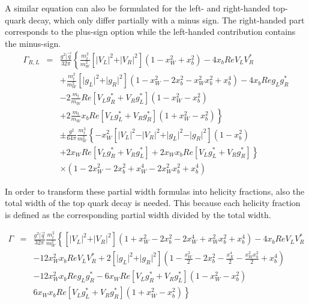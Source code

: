 A similar equation can also be formulated for the left- and right-handed top-quark decay, which only differ partially with a minus sign. The right-handed part corresponds to the plus-sign option while the left-handed contribution contains the minus-sign.
\begin{eqnarray}
 \Gamma_{R,L} & = & \frac{g^{2} \vert \vec{q}}{32 \pi} \left\lbrace \frac{m_{t}^{2}}{m_{W}^{2}} \left[ \vert V_{L} \vert^{2} + \vert V_{R} \vert^{2} \right] (1 - x_{W}^{2} + x_{b}^{2}) - 4x_{b}Re V_{L}V_{R}^{*} \right. \nonumber \\
            &   & + \frac{m_{t}^{2}}{m_{W}^{2}} \left[ \vert g_{L} \vert^{2} + \vert g_{R} \vert^{2} \right] (1 - x_{W}^{2} - 2x_{b}^{2} -x_{W}^{2} x_{b}^{2} + x_{b}^{4}) - 4x_{b}Re g_{L}g_{R}^{*} \nonumber \\
            &   & - 2 \frac{m_t}{m_W} Re \left[ V_{L}g_{R}^{*} + V_{R}g_{L}^{*} \right] (1- x_{W}^{2} - x_{b}^{2}) \nonumber \\
            &   &  \left. + 2 \frac{m_t}{m_W} x_b Re \left[ V_{L}g_{L}^{*} + V_{R}g_{R}^{*} \right] (1+ x_{W}^{2} - x_{b}^{2}) \right\rbrace \nonumber \\
           &   & \pm \frac{g^{2}}{64 \pi} \frac{m_{t}^{3}}{m_{W}^{2}} \left\lbrace -x_{W}^{2} \left[ \vert V_{L} \vert^{2} - \vert V_{R} \vert^{2} + \vert g_{L} \vert^{2} - \vert g_{R} \vert^{2} \right] (1-x_{b}^{2}) \right. \nonumber \\
            &   &  \left. + 2 x_{W} Re \left[ V_{L}g_{R}^{*} + V_{R}g_{L}^{*} \right] + 2x_{W} x_{b} Re \left[ V_{L}g_{L}^{*} + V_{R}g_{R}^{*} \right] \right\rbrace \nonumber \\
            &   & \times (1-2x_{W}^{2} - 2x_{b}^{2} + x_{W}^{4} - 2x_{W}^{2} x_{b}^{2} + x_{b}^{4})
\end{eqnarray}

In order to transform these partial width formulas into helicity fractions, also the total width of the top quark decay is needed. This because each helicity fraction is defined as the corresponding partial width divided by the total width.

\begin{eqnarray}
 \Gamma & = & \frac{g^{2} \vert \vec{q}}{32 \pi} \frac{m_{t}^{2}}{m_{W}^{2}} \left\lbrace \left[ \vert V_{L} \vert^{2} + \vert V_{R} \vert^{2} \right] (1 + x_{W}^{2} - 2x_{b}^{2} - 2 x_{W}^{4} + x_{W}^{2} x_{b}^{2} + x_{b}^{4}) - 4x_{b}Re V_{L}V_{R}^{*} \right. \nonumber \\
        &   & -12 x_{W}^{2} x_{b} Re V_{L} V_{R}^{*} + 2 \left[ \vert g_{L} \vert^{2} + \vert g_{R} \vert^{2} \right] \left( 1 - \frac{x_{W}^{2}}{2} - 2 x_{b}^{2} - \frac{x_{X}^{4}}{2} - \frac{x_{W}^{2} x_{b}^{2}}{2} +x_{b}^{4} \right) \nonumber \\
        &   & -12 x_{W}^{2} x_{b} Re g_{L} g_{R}^{*} - 6 x_{W} Re \left[ V_{L}g_{R}^{*} + V_{R}g_{L}^{*} \right] (1 - x_{W}^{2} - x_{b}^{2}) \nonumber \\
        &   & \left. 6 x_{W} x_{b} Re \left[ V_{L}g_{L}^{*} + V_{R}g_{R}^{*} \right] (1 + x_{W}^{2} - x_{b}^{2}) \right\rbrace
\end{eqnarray}

